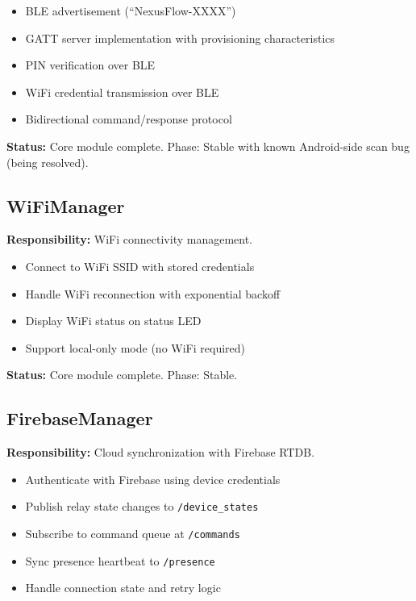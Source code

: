 \begin{itemize}
    \item BLE advertisement (``NexusFlow-XXXX'')
    \item GATT server implementation with provisioning characteristics
    \item PIN verification over BLE
    \item WiFi credential transmission over BLE
    \item Bidirectional command/response protocol
\end{itemize}

\textbf{Status:} Core module complete. Phase: Stable with known Android-side scan bug (being resolved).

\subsection{WiFiManager}

\textbf{Responsibility:} WiFi connectivity management.

\begin{itemize}
    \item Connect to WiFi SSID with stored credentials
    \item Handle WiFi reconnection with exponential backoff
    \item Display WiFi status on status LED
    \item Support local-only mode (no WiFi required)
\end{itemize}

\textbf{Status:} Core module complete. Phase: Stable.

\subsection{FirebaseManager}

\textbf{Responsibility:} Cloud synchronization with Firebase RTDB.

\begin{itemize}
    \item Authenticate with Firebase using device credentials
    \item Publish relay state changes to \texttt{/device\_states}
    \item Subscribe to command queue at \texttt{/commands}
    \item Sync presence heartbeat to \texttt{/presence}
    \item Handle connection state and retry logic
\end{itemize}

